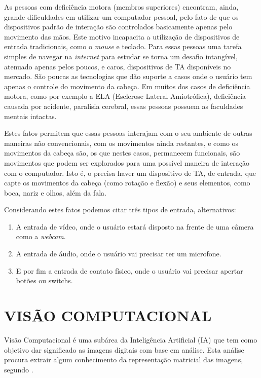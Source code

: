 As pessoas com deficiência motora (membros superiores) encontram, ainda, grande dificuldades em utilizar um computador pessoal, pelo fato de que os dispositivos padrão de interação são controlados basicamente apenas pelo movimento das mãos. Este motivo incapacita a utilização de dispositivos de entrada tradicionais, como o \textit{mouse} e teclado. Para essas pessoas uma tarefa simples de navegar na \textit{internet} para estudar se torna um desafio intangível, atenuado apenas pelos poucos, e caros, dispositivos de TA disponíveis no mercado. São poucas as tecnologias que dão suporte a casos onde o usuário tem apenas o controle do movimento da cabeça. Em muitos dos casos de deficiência motora, como por exemplo a ELA (Esclerose Lateral Amiotrófica), deficiência causada por acidente, paralisia cerebral, essas pessoas possuem as faculdades mentais intactas.


Estes fatos permitem que essas pessoas interajam com o seu ambiente de outras maneiras não convencionais, com os movimentos ainda restantes, e como os movimentos da cabeça são, os que nestes casos, permanecem funcionais, são movimentos que podem ser explorados para uma possível maneira de interação com o computador. Isto é, o precisa haver um dispositivo de TA, de entrada, que capte os movimentos da cabeça (como rotação e flexão) e seus elementos, como boca, nariz e olhos, além da fala. 

Considerando estes fatos podemos citar três tipos de entrada, alternativos:
\begin{enumerate}
\item A entrada de vídeo, onde o usuário estará disposto na frente de uma câmera como a \textit{webcam}.
\item A entrada de áudio, onde o usuário vai precisar ter um microfone.
\item E por fim a entrada de contato físico, onde o usuário vai precisar apertar botões ou switchs.
\end{enumerate}

% 
% 


\section{VISÃO COMPUTACIONAL}\label{Sub:vc}

Visão Computacional é uma subárea da Inteligência Artificial (IA) que tem como objetivo dar significado as imagens digitais com base em análise. Esta análise procura extrair algum conhecimento da representação matricial das imagens, segundo . 


